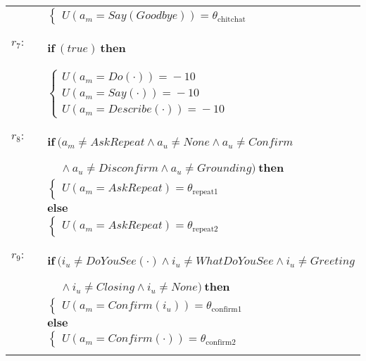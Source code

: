 \begin{footnotesize}
\begin{longtable}{p{2cm}l}
& \;\;\;\;\; $ \begin{cases}U(\mathit{a_m}\!=\!\mathit{Say(Goodbye)})\!=\!\theta_{\mathrm{chitchat}} \end{cases}$ \\ \\[-1mm]
$r_{7}$: \ \ & $ \textbf{if} \  (\mathit{true}) \  \textbf{then}$ \\ & \;\;\;\;\; $\begin{cases}U(\mathit{a_m}\!=\!\mathit{Do(\cdot)})\!=\!-10 \\
U(\mathit{a_m}\!=\!\mathit{Say(\cdot)})\!=\!-10 \\
U(\mathit{a_m}\!=\!\mathit{Describe(\cdot)})\!=\!-10 \end{cases}$ \\ \\[-1mm]
$r_{8}$: \ \ & $ \textbf{if} \ (\mathit{a_m}\!\neq\!\mathit{AskRepeat} \land \mathit{a_u}\!\neq\!\mathit{None} \land \mathit{a_u}\!\neq\!\mathit{Confirm} $ \\ & $\ \ \ \ \  \land \mathit{a_u}\!\neq\!\mathit{Disconfirm} \land \mathit{a_u}\!\neq\!\mathit{Grounding}) \ \textbf{then} $ \\
 & \;\;\;\;\; $ \begin{cases}U(\mathit{a_m}\!=\!\mathit{AskRepeat})\!=\!\theta_{\mathrm{repeat1}} \end{cases}$ \vspace{1mm} \\ & $ \textbf{else}$ \\
& \;\;\;\;\; $ \begin{cases}U(\mathit{a_m}\!=\!\mathit{AskRepeat})\!=\!\theta_{\mathrm{repeat2}} \end{cases}$ \\ \\[-1mm]
$r_{9}$: \ \ & $ \textbf{if} \ (\mathit{i_u}\!\neq\!\mathit{DoYouSee(\cdot)} \land \mathit{i_u}\!\neq\!\mathit{WhatDoYouSee} \land \mathit{i_u}\!\neq\!\mathit{Greeting} $ \\ & $\ \ \ \ \ \land \mathit{i_u}\!\neq\!\mathit{Closing} \land \mathit{i_u}\!\neq\!\mathit{None}) \ \textbf{then} $ \\
 & \;\;\;\;\; $ \begin{cases}U(\mathit{a_m}\!=\!\mathit{Confirm({i_u})})\!=\!\theta_{\mathrm{confirm1}} \end{cases}$ \vspace{1mm} \\ & $ \textbf{else}$ \\
& \;\;\;\;\; $ \begin{cases}U(\mathit{a_m}\!=\!\mathit{Confirm(\cdot)})\!=\!\theta_{\mathrm{confirm2}} \end{cases}$ \\ \\[-1mm]

\end{longtable}
\end{footnotesize}
